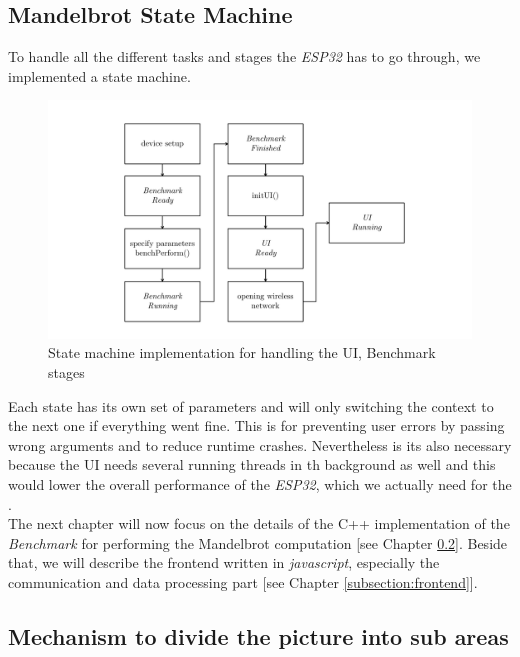 \subsection{Mandelbrot State Machine}

To handle all the different tasks and stages the \textit{ESP32} has to go through, we implemented a state machine.

\begin{figure}[htbp]
	\centerline{\includegraphics[width=1.1\linewidth]{images/State-Machine.pdf}}
	\caption{ State machine implementation for handling the UI, Benchmark stages }
	\label{fig:stateMachine}
\end{figure}  

Each state has its own set of parameters and will only switching the context to the next one if everything went fine. This is for preventing user errors by passing wrong arguments and to reduce runtime crashes. Nevertheless is its also necessary because the UI needs several running threads in th background as well and this would lower the overall performance of the \textit{ESP32}, which we actually need for the .\\   

\noindent The next chapter will now focus on the details of the C++ implementation of the \textit{Benchmark} for performing the Mandelbrot computation [see Chapter \ref{subsection:backend}]. Beside that, we will describe the frontend written in \textit{javascript}, especially the communication and data processing part [see Chapter \ref{subsection:frontend}]. 

\newpage

\subsection{Mechanism to divide the picture into sub areas} \label{subsection:backend}

